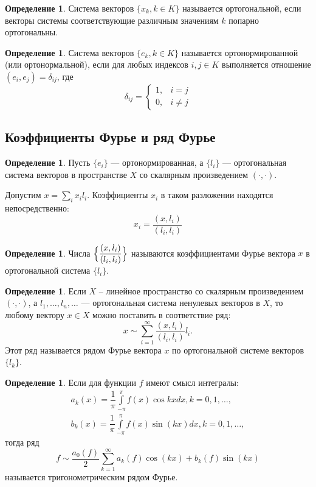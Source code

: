 \documentclass[12pt]{report}
\theoremstyle{definition}
\newtheorem{definition}[theorem]{Определение}
\begin{document}
\begin{definition}
Система векторов $\{x_k, k \in K\}$ называется ортогональной, если векторы системы
соответствующие различным значениям $k$ попарно ортогональны.
\end{definition}

\begin{definition}
Система векторов $\{e_k, k \in K\}$ называется ортонормированной (или ортонормальной),
если для любых индексов $i, j \in K$ выполняется отношение $(e_i, e_j) = \delta_{ij}$,
где
$$
\delta_{ij} = \left\{\begin{matrix} 
1, &  i=j  \\ 
0, &  i \ne j \end{matrix}\right.
$$
\end{definition}

\subsection{Коэффициенты Фурье и ряд Фурье}
\begin{definition}
Пусть $\{e_i\}$ --- ортонормированная, а $\{l_i\}$ --- ортогональная
система векторов в пространстве $X$ со скалярным произведением $(\cdot, \cdot)$.
\end{definition}

Допустим $x = \sum\limits_i x_i l_i$. Коэффициенты $x_i$ в таком разложении
находятся непосредственно:
$$
x_i = \dfrac{(x,l_i)}{(l_i, l_i)}
$$

\begin{definition}
Числа $\Bigl \{\dfrac{(x,l_i)}{(l_i, l_i)}\Bigl \}$ называются коэффициентами
Фурье вектора $x$ в ортогональной система $\{l_i\}$.
\end{definition}

\begin{definition}
Если $X$ -- линейное пространство со скалярным произведением
$(\cdot, \cdot)$, а $l_1, \dots, l_n, \dots$ --- ортогональная
система ненулевых векторов в $X$, то любому вектору $x \in X$
можно поставить в соответствие ряд:
$$
x \sim \sum\limits_{i = 1}^\infty \dfrac{(x, l_i)}{(l_i, l_i)} l_i.
$$
Этот ряд называется рядом Фурье вектора $x$ по ортогональной системе
векторов $\{l_k\}$.
\end{definition}

\begin{definition}
Если для функции $f$ имеют смысл интегралы:
\begin{gather*}
a_k(x) = \dfrac{1}{\pi} \int\limits_{-\pi}^{\pi} f(x) \cos kx dx, k = 0, 1, \dots, \\
b_k(x) = \dfrac{1}{\pi} \int\limits_{-\pi}^{\pi} f(x) \sin(kx) dx, k = 0, 1, \dots,
\end{gather*}
тогда ряд
$$
f \sim \dfrac{a_0(f)}{2} \sum\limits_{k = 1}^{\infty} a_k(f) \cos(kx) + b_k(f) \sin(kx)
$$
называется тригонометрическим рядом Фурье.
\end{definition}
\end{document}
